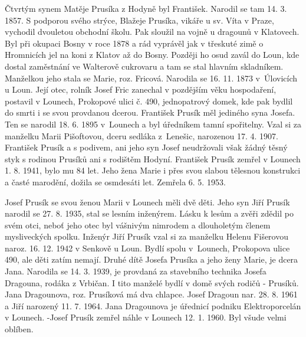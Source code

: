 \documentclass[../dejiny-rodu-prusiku.tex]{subfiles}
\begin{document}
Čtvrtým synem Matěje Prusíka z Hodyně byl František. Narodil se tam 14. 3. 1857. S podporou svého strýce, Blažeje Prusíka, vikáře u sv. Víta v Praze, vychodil dvouletou obchodní školu. Pak sloužil na vojně u dragounů v Klatovech. Byl při okupaci Bosny v roce 1878 a rád vyprávěl jak v třeskuté zimě o Hromnicích jel na koni z Klatov až do Bosny. Později ho osud zavál do Loun, kde dostal zaměstnání ve Walterově cukrovaru a tam se stal hlavním skladníkem. Manželkou jeho stala se Marie, roz. Fricová. Narodila se 16. 11. 1873 v Úlovicích u Loun. Její otec, rolník Josef Fric zanechal v pozdějším věku hospodaření, postavil v Lounech, Prokopové ulici č. 490, jednopatrový domek, kde pak bydlil do smrti i se svou provdanou dcerou. František Prusík měl jediného syna Josefa. Ten se narodil 18. 6. 1895 v Lounech a byl úředníkem tamní spořitelny. Vzal si za manželku Marii Pišoftovou, dceru sedláka z Lenešic, narozenou 17. 4. 1907. František Prusík a s podivem, ani jeho syn Josef neudržovali však žádný těsný styk s rodinou Prusíků ani s rodištěm Hodyní. František Prusík zemřel v Lounech 1. 8. 1941, bylo mu 84 let. Jeho žena Marie i přes svou slabou tělesnou konstrukci a časté marodění, dožila se osmdesáti let. Zemřela 6. 5. 1953.

Josef Prusík se svou ženou Marii v Lounech měli dvě děti. Jeho syn Jiří Prusík narodil se 27. 8. 1935, stal se lesním inženýrem. Lásku k lesům a zvěři zdědil po svém otci, neboť jeho otec byl vášnivým nimrodem a dlouholetým členem mysliveckých spolku. Inženýr Jiří Prusík vzal si za manželku Helenu Fišerovou naroz. 16. 12. 1942 v Senkově u Loun. Bydlí spolu v Lounech, Prokopova ulice 490, ale děti zatím nemají.  Druhé dítě Josefa Prusíka a jeho ženy Marie, je dcera Jana. Narodila se 14. 3. 1939, je provdaná za stavebního technika Josefa Dragouna, rodáka z Vrbičan. I tito manželé bydlí v domě svých rodičů - Prusíků. Jana Dragounova, roz. Prusíková
má dva chlapce. Josef Dragoun nar. 28. 8. 1961 a Jiří narozený 11. 7. 1964. Jana Dragounova je úřednicí podniku Elektroporcelán v Lounech. -Josef Prusík zemřel náhle v Lounech 12. 1. 1960. Byl všude velmi oblíben.
\end{document}
